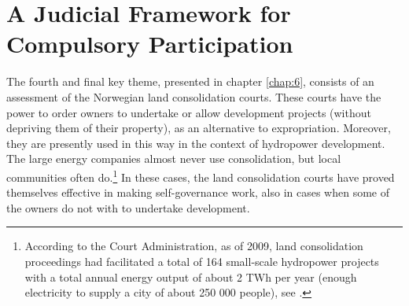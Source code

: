 \section{A Judicial Framework for Compulsory Participation}\label{sec:4}

The fourth and final key theme, presented in chapter \ref{chap:6}, consists of an assessment of the Norwegian land consolidation courts. These courts have the power to order owners to undertake or allow development projects (without depriving them of their property), as an alternative to expropriation. Moreover, they are presently used in this way in the context of hydropower development. The large energy companies almost never use consolidation, but local communities often do.\footnote{According to the Court Administration, as of 2009, land consolidation proceedings had facilitated a total of 164 small-scale hydropower projects with a total annual energy output of about 2 TWh per year (enough electricity to supply a city of about 250 000 people), see \cite{dom09}.} In these cases, the land consolidation courts have proved themselves effective in making self-governance work, also in cases when some of the owners do not with to undertake development.

